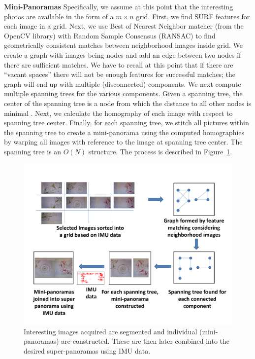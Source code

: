 {\bf Mini-Panoramas} Specifically, we assume at this point that the
interesting photos are available in the form of a $m \times n$
grid. First, we find SURF \cite{Bay} features for each image in a
grid. Next, we use Best of Nearest Neighbor matcher (from the OpenCV
library) with Random Sample Consensus (RANSAC) \cite{Fischler1981} to
find geometrically consistent matches between neighborhood images
inside grid.  We create a graph with images being nodes and add an
edge between two nodes if there are sufficient matches. We have to
recall at this point that if there are ``vacant spaces'' there will
not be enough features for successful matches; the graph will end up
with multiple (disconnected) components.  We next compute multiple
spanning trees for the various components. Given a spanning tree, the
center of the spanning tree is a node from which the distance to all
other nodes is minimal \cite{Kocay}. Next, we calculate the homography
of each image with respect to spanning tree center.  Finally, for each
spanning tree, we stitch all pictures within the spanning tree to
create a mini-panorama using the computed homographies by warping all
images with reference to the image at spanning tree center. The
spanning tree is an $O(N)$ structure. The process is described in
Figure~\ref{fig:graph}.

\begin{figure}[t!]
  \centering
  \includegraphics[width=\textwidth]{figures/vacantSpaces/graphCreation} 
  \caption[Creation of Mini-panoramas]{ \label{fig:graph} Interesting images
  acquired are segmented and individual (mini-panoramas) are constructed. These
    are then later combined into the desired super-panoramas using IMU data.}
\end{figure}    


